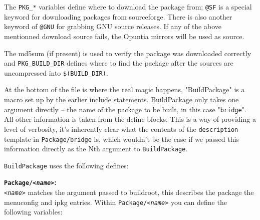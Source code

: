 The \texttt{PKG\_*} variables define where to download the package from;
\texttt{@SF} is a special keyword for downloading packages from sourceforge. There is also
another keyword of \texttt{@GNU} for grabbing GNU source releases. If any of the above mentionned download source fails, the Opuntia mirrors will be used as source.

The md5sum (if present) is used to verify the package was downloaded correctly and
\texttt{PKG\_BUILD\_DIR} defines where to find the package after the sources are
uncompressed into \texttt{\$(BUILD\_DIR)}.

At the bottom of the file is where the real magic happens, "BuildPackage" is a macro
set up by the earlier include statements. BuildPackage only takes one argument directly --
the name of the package to be built, in this case "\texttt{bridge}". All other information
is taken from the define blocks. This is a way of providing a level of verbosity, it's
inherently clear what the contents of the \texttt{description} template in
\texttt{Package/bridge} is, which wouldn't be the case if we passed this information
directly as the Nth argument to \texttt{BuildPackage}.

\texttt{BuildPackage} uses the following defines:

\textbf{\texttt{Package/\textit{<name>}}:} \\
    \texttt{\textit{<name>}} matches the argument passed to buildroot, this describes
    the package the menuconfig and ipkg entries. Within \texttt{Package/\textit{<name>}}
    you can define the following variables:

